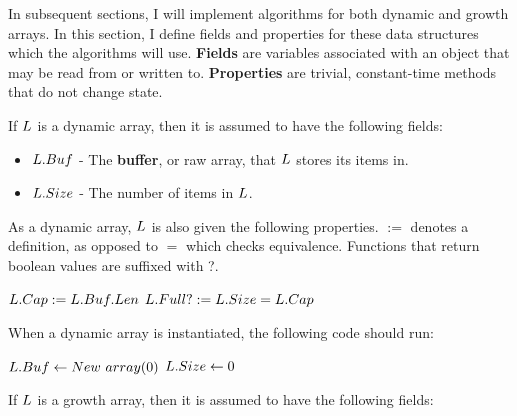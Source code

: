 In subsequent sections, I will implement algorithms for both dynamic and growth arrays. In this section, I define fields and properties for these data structures which the algorithms will use. \textbf{Fields} are variables associated with an object that may be read from or written to. \textbf{Properties} are trivial, constant-time methods that do not change state.

If $\VarList$ is a dynamic array, then it is assumed to have the following fields:

\begin{itemize}
	\item $L.Buf$ - The \textbf{buffer}, or raw array, that $\VarList$ stores its items in.
	\item $L.Size$ - The number of items in $\VarList$.
\end{itemize}

As a dynamic array, $\VarList$ is also given the following properties. $:=$ denotes a definition, as opposed to $=$ which checks equivalence. Functions that return boolean values are suffixed with ?.

\begin{algorithm}
	\begin{algorithmic}
		\State $L.Cap := L.Buf.Len$
		\State
		\State $L.Full? := L.Size = L.Cap$
	\end{algorithmic}
\end{algorithm}

When a dynamic array is instantiated, the following code should run:

\begin{algorithm}
	\begin{algorithmic}
		\Procedure{$\FuncConstructor$}{$\VarList$}
			\State $L.Buf \gets New\ array(0)$
			\State $L.Size \gets 0$
		\EndProcedure
	\end{algorithmic}
\end{algorithm}

If $\VarList$ is a growth array, then it is assumed to have the following fields:

